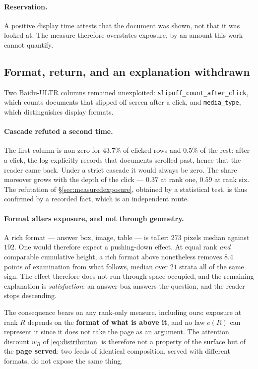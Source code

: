 \documentclass[11pt,a4paper]{article}
\begin{document}
\paragraph{Reservation.} A positive display time attests that the document was shown, not that it
was looked at. The measure therefore overstates exposure, by an amount this work cannot quantify.


\subsection{Format, return, and an explanation withdrawn}
\label{sec:formatreturn}

Two Baidu-ULTR columns remained unexploited: \texttt{slipoff\_count\_after\_click}, which counts
documents that slipped off screen after a click, and \texttt{media\_type}, which distinguishes
display formats.

\paragraph{Cascade refuted a second time.} The first column is non-zero for $43.7\%$ of clicked
rows and $0.5\%$ of the rest: after a click, the log explicitly records that documents scrolled
past, hence that the reader came back. Under a strict cascade it would always be zero. The share
moreover grows with the depth of the click --- $0.37$ at rank one, $0.59$ at rank six. The
refutation of \S\ref{sec:measuredexposure}, obtained by a statistical test, is thus confirmed by a
recorded fact, which is an independent route.

\paragraph{Format alters exposure, and not through geometry.} A rich format --- answer box, image,
table --- is taller: $273$ pixels median against $192$. One would therefore expect a pushing-down
effect. At equal rank \emph{and} comparable cumulative height, a rich format above nonetheless
removes $8.4$ points of examination from what follows, median over $21$ strata all of the same
sign. The effect therefore does not run through space occupied, and the remaining explanation is
\emph{satisfaction}: an answer box answers the question, and the reader stops descending.

The consequence bears on any rank-only measure, including ours: exposure at rank $R$ depends on
the \textbf{format of what is above it}, and no law $e(R)$ can represent it since it does not take
the page as an argument. The attention discount $w_R$ of \eqref{eq:distribution} is therefore not
a property of the surface but of the \textbf{page served}: two feeds of identical composition,
served with different formats, do not expose the same thing.
\end{document}
